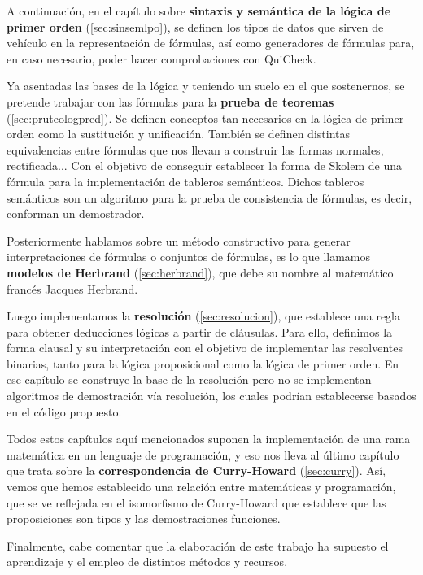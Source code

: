 A continuación, en el capítulo sobre \textbf{sintaxis y semántica de la lógica de primer orden}
(\ref{sec:sinsemlpo}), se definen los tipos de datos que sirven de vehículo en la representación
de fórmulas, así como generadores de fórmulas para, en caso necesario, poder hacer comprobaciones
con QuiCheck.

Ya asentadas las bases de la lógica y teniendo un suelo en el que sostenernos, se pretende trabajar
con las fórmulas para la \textbf{prueba de teoremas} (\ref{sec:pruteologpred}). Se definen conceptos
tan necesarios en la lógica de primer orden como la sustitución y unificación. También se definen
distintas equivalencias entre fórmulas que nos llevan a construir las formas normales, rectificada...
Con el objetivo de conseguir establecer la forma de Skolem de una fórmula para la implementación de
tableros semánticos. Dichos tableros semánticos son un algoritmo para la prueba de consistencia de
fórmulas, es decir, conforman un demostrador. 

Posteriormente hablamos sobre un método constructivo para generar interpretaciones de fórmulas
o conjuntos de fórmulas, es lo que llamamos \textbf{modelos de Herbrand} (\ref{sec:herbrand}),
que debe su nombre al matemático francés Jacques Herbrand.

Luego implementamos la \textbf{resolución} (\ref{sec:resolucion}), que establece una regla para obtener
deducciones lógicas a partir de cláusulas. Para ello, definimos la forma clausal y su interpretación con el objetivo de implementar las resolventes binarias, tanto para la lógica proposicional como
la lógica de primer orden. En ese capítulo se construye la base de la resolución pero no se
implementan algoritmos de demostración vía resolución, los cuales podrían establecerse
basados en el código propuesto. 
  
Todos estos capítulos aquí mencionados suponen la implementación de una rama matemática
en un lenguaje de programación, y eso nos lleva al último capítulo que trata sobre
la \textbf{correspondencia de Curry-Howard} (\ref{sec:curry}). Así, vemos que hemos
establecido una relación entre matemáticas y programación, que se ve reflejada
en el isomorfismo de Curry-Howard que establece que las proposiciones son tipos y
las demostraciones funciones.

\vspace{3mm}

Finalmente, cabe comentar que la elaboración de este trabajo ha supuesto el aprendizaje
y el empleo de distintos métodos y recursos.

